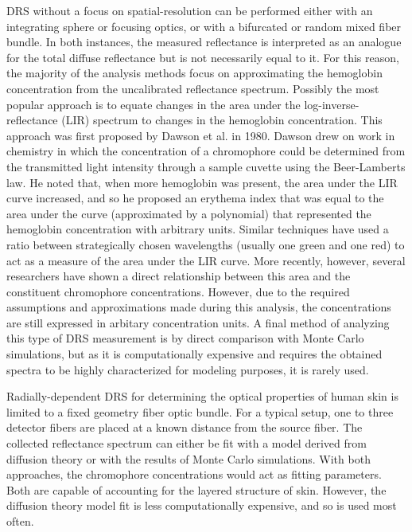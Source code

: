 DRS without a focus on spatial-resolution can be performed either with an integrating sphere or focusing optics, or with a bifurcated or random mixed fiber bundle. In both instances, the measured reflectance is interpreted as an analogue for the total diffuse reflectance but is not necessarily equal to it. For this reason, the majority of the analysis methods focus on approximating the hemoglobin concentration from the uncalibrated reflectance spectrum. Possibly the most popular approach is to equate changes in the area under the log-inverse-reflectance (LIR) spectrum to changes in the hemoglobin concentration. This approach was first proposed by Dawson et al. in 1980.\cite{Dawson1980} Dawson drew on work in chemistry in which the concentration of a chromophore could be determined from the transmitted light intensity through a sample cuvette using the Beer-Lamberts law. He noted that, when more hemoglobin was present, the area under the LIR curve increased, and so he proposed an erythema index that was equal to the area under the curve (approximated by a polynomial) that represented the hemoglobin concentration with arbitrary units. Similar techniques have used a ratio between strategically chosen wavelengths (usually one green and one red) to act as a measure of the area under the LIR curve.\cite{Diffey1984,Lock-Andersen1998,Bodekaer2013} More recently, however, several researchers have shown a direct relationship between this area and the constituent chromophore concentrations.\cite{Stamatas2008,Kollias2010} However, due to the required assumptions and approximations made during this analysis, the concentrations are still expressed in arbitary concentration units. A final method of analyzing this type of DRS measurement is by direct comparison with Monte Carlo simulations,\cite{Meglinski2002,Yu2008} but as it is computationally expensive and requires the obtained spectra to be highly characterized for modeling purposes, it is rarely used.

Radially-dependent DRS for determining the optical properties of human skin is limited to a fixed geometry fiber optic bundle. For a typical setup, one to three detector fibers are placed at a known distance from the source fiber. The collected reflectance spectrum can either be fit with a model derived from diffusion theory or with the results of Monte Carlo simulations.\cite{Nishidate2011a} With both approaches, the chromophore concentrations would act as fitting parameters. Both are capable of accounting for the layered structure of skin. However, the diffusion theory model fit is less computationally expensive, and so is used most often.\cite{Zonios2001,Zonios2009,Reif2011,Tseng2012}

